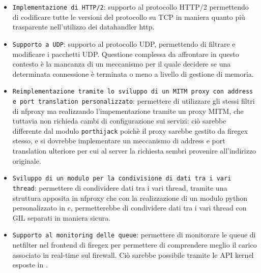 \begin{itemize}
    \setlength{\itemsep}{5pt}
    \setlength{\parskip}{5pt}
    \item \texttt{Implementazione di HTTP/2}: supporto al protocollo HTTP/2 permettendo di codificare tutte le versioni del protocollo su TCP in maniera
    quanto più trasparente nell'utilizzo dei datahandler http.
    \item \texttt{Supporto a UDP}: supporto al protocollo UDP, permettendo di filtrare e modificare i pacchetti UDP. Questione complessa da affrontare
    in questo contesto è la mancanza di un meccanismo per il quale decidere se una determinata connessione è terminata o meno a livello di gestione di memoria.
    \item \texttt{Reimplementazione tramite lo sviluppo di un MITM proxy con address e port translation personalizzato}: permettere di utilizzare gli stessi filtri di nfproxy
    ma realizzando l'impementazione tramite un proxy MITM, che tuttavia non richieda cambi di configurazione sui servizi: ciò sarebbe differente dal
    modulo \texttt{porthijack} poichè il proxy sarebbe gestito da firegex stesso, e si dovrebbe implementare un meccanismo di address e port translation
    ulteriore per cui al server la richiesta sembri provenire all'indirizzo originale.
    \item \texttt{Sviluppo di un modulo per la condivisione di dati tra i vari thread}: permettere di condividere dati tra i vari thread, tramite una struttura apposita in nfproxy
    che con la realizzazione di un modulo python personalizzato in c, permetterebbe di condividere dati tra i vari thread con GIL separati in maniera sicura.
    \item \texttt{Supporto al monitoring delle queue}: permettere di monitorare le queue di netfilter nel frontend di firegex per permettere di comprendere
    meglio il carico associato in real-time sul firewall. Ciò sarebbe possibile tramite le API kernel esposte in .
\end{itemize}
